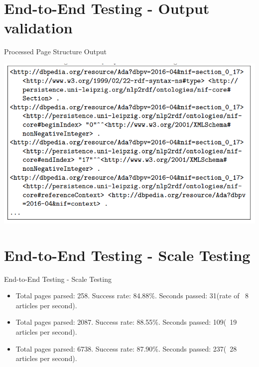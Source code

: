 \documentclass[czech,aspectratio=169]{beamer}
\begin{document}
	\section{End-to-End Testing - Output validation}
	\begin{frame}{Processed Page Structure Output}
		\begin{center}
			\includegraphics[width=0.65\paperwidth]{nif_page_struct.png}
		\end{center}
	\end{frame}

	\section{End-to-End Testing - Scale Testing}
	\begin{frame}{End-to-End Testing - Scale Testing}
		\begin{itemize}
			\item Total pages parsed: 258. Success rate: 84.88\%. Seconds passed: 31(rate of ~8 articles per second).
			\item Total pages parsed: 2087. Success rate: 88.55\%. Seconds passed: 109(~19 articles per second).
			\item Total pages parsed: 6738. Success rate: 87.90\%. Seconds passed: 237(~28 articles per second).
		\end{itemize}
	
 	\end{frame}
\end{document}
